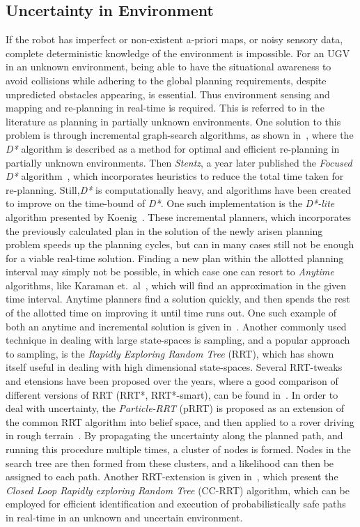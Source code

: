 \subsection{Uncertainty in Environment}
If the robot has imperfect or non-existent a-priori maps, or noisy sensory data,
complete deterministic knowledge of the environment is impossible. For an UGV in
an unknown environment, being able to have the situational awareness to avoid
collisions while adhering to the global planning requirements, despite
unpredicted obstacles appearing, is essential. Thus environment sensing and
mapping and re-planning in real-time is required. This is referred to in the
literature as planning in partially unknown environments. One solution to this
problem is through incremental graph-search algorithms, as shown
in~\cite{stentzOptimalEfficientPath}, where the \textsl{D*} algorithm is
described as a method for optimal and efficient re-planning in partially unknown
environments. Then \textit{Stentz}, a year later published the \textit{Focused
  D*} algorithm~\cite{stentz1995focussed}, which incorporates heuristics to
reduce the total time taken for re-planning. Still,\textit{D*} is
computationally heavy, and algorithms have been created to improve on the
time-bound of \textit{D*}. One such implementation is the \textit{D*-lite}
algorithm presented by Koenig~\cite{koenig2002d}. These incremental planners,
which incorporates the previously calculated plan in the solution of the newly
arisen planning problem speeds up the planning cycles, but can in many cases
still not be enough for a viable real-time solution. Finding a new plan within
the allotted planning interval may simply not be possible, in which case one can
resort to \textit{Anytime} algorithms, like Karaman et.\
al~\cite{karamanAnytimeMotionPlanning2011}, which will find an approximation in
the given time interval. Anytime planners find a solution quickly, and then
spends the rest of the allotted time on improving it until time runs out. One
such example of both an anytime and incremental solution is given
in~\cite{likhachevAnytimeSearchDynamic2008}. Another commonly used technique in
dealing with large state-spaces is sampling, and a popular approach to sampling,
is the \textit{Rapidly Exploring Random Tree} (RRT), which has shown itself
useful in dealing with high dimensional state-spaces. Several RRT-tweaks and
etensions have been proposed over the years, where a good comparison of
different versions of RRT (RRT*, RRT*-smart), can be found
in~\cite{noreenComparisonRRTRRT2016}. In order to deal with uncertainty, the
\textit{Particle-RRT} (pRRT) is proposed as an extension of the common RRT
algorithm into belief space, and then applied to a rover driving in rough
terrain~\cite{melchiorParticleRRTPath2007}. By propagating the uncertainty along
the planned path, and running this procedure multiple times, a cluster of nodes
is formed. Nodes in the search tree are then formed from these clusters, and a
likelihood can then be assigned to each path. Another RRT-extension is given
in~\cite{Luders_2013}, which present the \textit{Closed Loop Rapidly exploring
  Random Tree} (CC-RRT) algorithm, which can be employed for efficient
identification and execution of probabilistically safe paths in real-time in an
unknown and uncertain environment.


